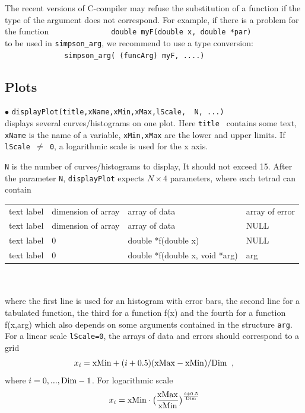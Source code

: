 \documentclass[12pt,a4paper]{article}
\begin{document}
The recent versions of  C-compiler may refuse the substitution of a function if the type of the argument does not correspond.
For example, if there is a problem  for the function
\verb|              double myF(double x, double *par) |\\ 
to be used in {\tt simpson\_arg}, we recommend to use a type conversion:\\
\verb|              simpson_arg( (funcArg) myF, ....) |


\subsection{Plots}
\noindent$\bullet$ \verb|displayPlot(title,xName,xMin,xMax,lScale,  N, ...)|\\
displays several  curves/histograms on one plot.  Here {\tt title  } contains some text, {\tt xName} is the name of a variable, 
{\tt xMin,xMax} are the lower and upper limits. If {\tt lScale $\neq$ 0}, a logarithmic scale 
is used for the x axis.


{\tt N} is the number of
curves/histograms  to display,  It should not exceed 15.
 After the parameter {\tt N}, {\tt displayPlot} expects $N\times 4$ parameters, 
where each tetrad can  contain \\


\begin{tabular}{|l|l|l|l|}
\hline
   text label &  dimension  of array     &  array of data               & array of error     \\            
   text label   &      dimension of array            &  array of data               &  NULL              \\  
  text label    &   0             & double *f(double x)  &  NULL              \\                 
   text label    &       0         & double *f(double x, void *arg)&  arg       \\
\hline    
\end{tabular}\\
\\
where the first line is used for an histogram with error bars, the second line for a tabulated function, the third for a function f(x) and the fourth for a function f(x,arg) which also depends on some arguments contained in the structure \verb|arg|.
 For a linear scale  {\tt lScale=0}, the arrays of data  and errors  should correspond to a grid
$$x_i={\rm xMin}+(i+0.5)({\rm xMax}- {\rm xMin})/{\rm Dim}\;\;,$$ 
where $i=0,...,{\rm Dim}-1$. For logarithmic scale  
   $$x_i={\rm xMin}\cdot \big(\frac{{\rm xMax}}{{\rm xMin}}\big)^\frac{i+0.5}{{\rm Dim}}$$
\end{document}
